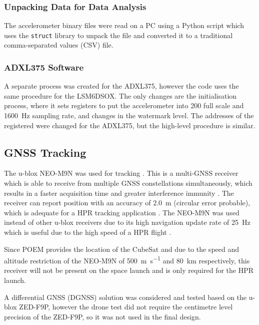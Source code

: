 \documentclass{report}
\begin{document}
\subsubsection{Unpacking Data for Data Analysis}

The accelerometer binary files were read on a PC using a Python script which uses the \texttt{struct} library to unpack the file and converted it to a traditional comma-separated values (CSV) file.

\subsubsection{ADXL375 Software}

A separate process was created for the ADXL375, however the code uses the same procedure for the LSM6DSOX. The only changes are the initialisation process, where it sets registers to put the accelerometer into \SI{200}{\gacc} full scale and \SI{1600}{\hertz} sampling rate, and changes in the watermark level. The addresses of the registered were changed for the ADXL375, but the high-level procedure is similar.

\subsection{GNSS Tracking}

The u-blox NEO-M9N was used for tracking \cite{ublox2023neo_m9n_datasheet}. This is a multi-GNSS receiver which is able to receive from multiple GNSS constellations simultaneously, which results in a faster acquisition time and greater interference immunity \cite{ublox2023neo_m9n_datasheet}. The receiver can report position with an accuracy of \SI{2.0}{\metre} (circular error probable), which is adequate for a HPR tracking application \cite{ublox2023neo_m9n_datasheet}. The NEO-M9N was used instead of other u-blox receivers due to its high navigation update rate of \SI{25}{\hertz} which is useful due to the high speed of a HPR flight \cite{ublox2023neo_m9n_datasheet}.

Since POEM provides the location of the CubeSat and due to the speed and altitude restriction of the NEO-M9N of \SI{500}{\metre\per\second} and \SI{80}{\kilo\metre} respectively, this receiver will not be present on the space launch and is only required for the HPR launch.

A differential GNSS (DGNSS) solution was considered and tested based on the u-blox ZED-F9P, however the drone test did not require the centimetre level precision of the ZED-F9P, so it was not used in the final design.
\end{document}
